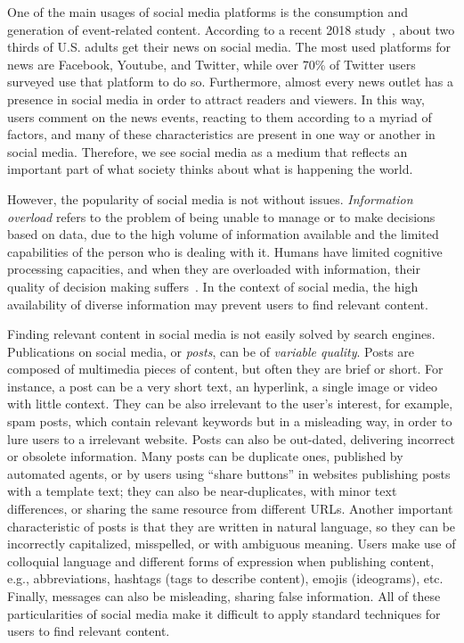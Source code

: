 \begin{intro}


One of the main usages of social media platforms is the consumption and
generation of event-related content. 
%
According to a recent 2018 study~\cite{pewresearch}, about two thirds of U.S.
adults get their news on social media.
%
The most used platforms for news are Facebook, Youtube, and Twitter,
while over 70\% of Twitter users surveyed use that platform to do so.
%
Furthermore, almost every news outlet has a presence in social media
in order to attract readers and viewers.
%
In this way, users comment on the news events, reacting to them according to a
myriad of factors, and many of these characteristics are present in one way or
another in social media.
%
Therefore, we see social media as a medium that reflects an important 
part of what society thinks about what is happening the world.





However, the popularity of social media is not without issues. 
%
{\em Information overload} refers to the problem of being unable to manage or to
make decisions based on data, due to the high volume of information available
and the limited capabilities of the person who is dealing with it. 
%
Humans have limited cognitive processing capacities, and when they are
overloaded with information, their quality of decision making
suffers~\cite{gross1964managing}. 
%
In the context of social media, the high availability of diverse information may
prevent users to find relevant content.


Finding relevant content in social media is not easily solved by search engines.
%
Publications on social media, or {\em posts}, can be of {\em variable quality}.
%
Posts are composed of multimedia pieces of content, but often they are brief or
short.
%
For instance, a post can be a very short text, an hyperlink, a single image or
video with little context.
%
They can be also irrelevant to the user's interest, for example, spam posts,
which contain relevant keywords but in a misleading way, in order to lure users
to a irrelevant website. 
%
Posts can also be out-dated, delivering incorrect or obsolete information. 
%
Many posts can be duplicate ones, published by automated agents, or by users
using ``share buttons'' in websites publishing posts with a template text; 
%
they can also be near-duplicates, with minor text differences, or sharing the
same resource from different URLs.
%
Another important characteristic of posts is that they are written in natural
language, so they can be incorrectly capitalized, misspelled, or with ambiguous
meaning.
%
Users make use of colloquial language and different forms of expression when
publishing content, e.g., abbreviations, hashtags (tags to describe content),
emojis (ideograms), etc.
%
Finally, messages can also be misleading, sharing false information.
%
All of these particularities of social media make it difficult to apply standard
techniques for users to find relevant content.


\end{intro}
